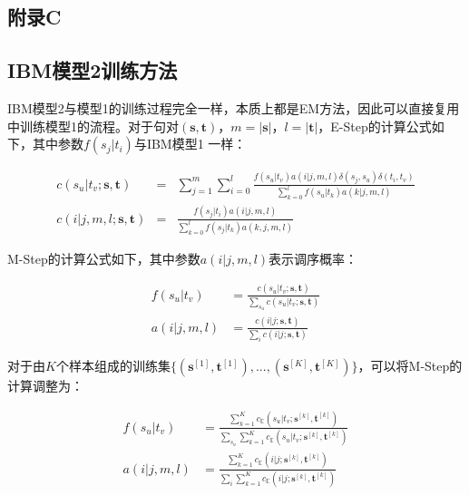 \begin{appendices}
\chapter{附录C}
\label{appendix-C}


\section{IBM模型2训练方法}

IBM模型2与模型1的训练过程完全一样，本质上都是EM方法，因此可以直接复用{\chapterfive}中训练模型1的流程。对于句对$(\mathbf{s},\mathbf{t})$，$m=|\mathbf{s}|$，$l=|\mathbf{t}|$，E-Step的计算公式如下，其中参数$f(s_j|t_i)$与IBM模型1 一样：

\begin{eqnarray}
c(s_u|t_v;\mathbf{s},\mathbf{t}) &=&\sum\limits_{j=1}^{m} \sum\limits_{i=0}^{l} \frac{f(s_u|t_v)a(i|j,m,l) \delta(s_j,s_u)\delta (t_i,t_v) }   {\sum_{k=0}^{l} f(s_u|t_k)a(k|j,m,l)} \\
c(i|j,m,l;\mathbf{s},\mathbf{t}) &=&\frac{f(s_j|t_i)a(i|j,m,l)}   {\sum_{k=0}^{l} f(s_j|t_k)a(k,j,m,l)}
\label{eq:append-1}
\end{eqnarray}

\parinterval M-Step的计算公式如下，其中参数$a(i|j,m,l)$表示调序概率：

\begin{eqnarray}
f(s_u|t_v) &=\frac{c(s_u|t_v;\mathbf{s},\mathbf{t}) }    {\sum_{s_u} c(s_u|t_v;\mathbf{s},\mathbf{t})} \\
a(i|j,m,l) &=\frac{c(i|j;\mathbf{s},\mathbf{t})}  {\sum_{i}c(i|j;\mathbf{s},\mathbf{t})}
\label{eq:append-2}
\end{eqnarray}

对于由$K$个样本组成的训练集$\{(\mathbf{s}^{[1]},\mathbf{t}^{[1]}),...,(\mathbf{s}^{[K]},\mathbf{t}^{[K]})\}$，可以将M-Step的计算调整为：

\begin{eqnarray}
f(s_u|t_v) &=\frac{\sum_{k=1}^{K}c_{\mathbb{E}}(s_u|t_v;\mathbf{s}^{[k]},\mathbf{t}^{[k]}) }    {\sum_{s_u} \sum_{k=1}^{K} c_{\mathbb{E}}(s_u|t_v;\mathbf{s}^{[k]},\mathbf{t}^{[k]})} \\
a(i|j,m,l) &=\frac{\sum_{k=1}^{K}c_{\mathbb{E}}(i|j;\mathbf{s}^{[k]},\mathbf{t}^{[k]})}  {\sum_{i}\sum_{k=1}^{K}c_{\mathbb{E}}(i|j;\mathbf{s}^{[k]},\mathbf{t}^{[k]})}
\label{eq:append-3}
\end{eqnarray}


\end{appendices}
